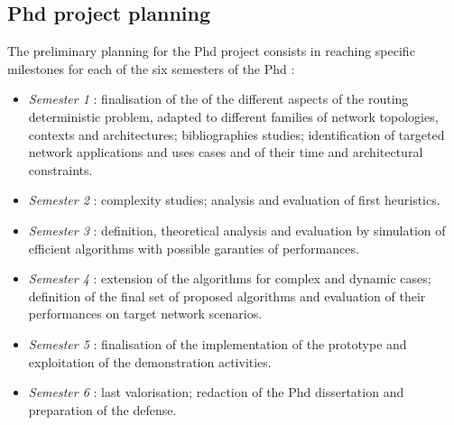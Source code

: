 \documentclass{article}
\begin{document}
 \subsection*{Phd project planning}
 The preliminary  planning for the Phd project consists in  reaching specific milestones for each of the six semesters of the Phd :
 \begin{itemize}
 \item {\it Semester 1 }: finalisation of the of the different aspects of the routing deterministic problem, adapted to different families of network topologies, contexts and architectures; bibliographies studies; identification of targeted network applications and uses cases and of their time and architectural constraints.
 \item {\it Semester 2 }: complexity studies; analysis and evaluation of first heuristics.
 \item {\it Semester 3 }: definition, theoretical analysis and evaluation by simulation of efficient algorithms with possible garanties of performances. 
 \item {\it Semester 4 }: extension of the algorithms for complex and dynamic cases; definition of the final set of proposed algorithms and evaluation of their performances on target network scenarios.
 \item {\it Semester 5 }: finalisation of the implementation of the prototype and exploitation of the demonstration activities.
 \item {\it Semester 6 }: last valorisation; redaction of the  Phd dissertation and preparation of the defense.
  \end{itemize}


\end{document}
